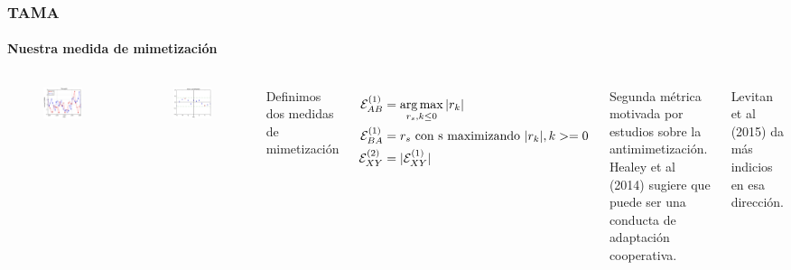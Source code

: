 \begin{frame}
\frametitle{TAMA}
\framesubtitle{Nuestra medida de mimetización}

  \begin{columns}
    \begin{figure}[t]
      \includegraphics[scale=0.28]{images/time_plot.png}
    \end{figure}

    \begin{figure}[t]
      \includegraphics[scale=0.28]{images/cross_correlogram_2.png}
    \end{figure}


    Definimos dos medidas de mimetización

    \begin{align*}
      \mathcal{E}_{AB}^{(1)} &= \operatorname*{arg\,max}_{r_s, k \leq 0} |r_k|  \\
      \mathcal{E}_{BA}^{(1)} &= r_s \text{ con s maximizando } |r_k|,  k >= 0  \\
      \mathcal{E}_{XY}^{(2)} &= |\mathcal{E}_{XY}^{(1)}|
    \end{align*}

    Segunda métrica motivada por estudios sobre la antimimetización. Healey et al (2014) sugiere que puede ser una conducta de adaptación cooperativa.

    Levitan et al (2015) da más indicios en esa dirección.
  \end{columns}
\end{frame}

